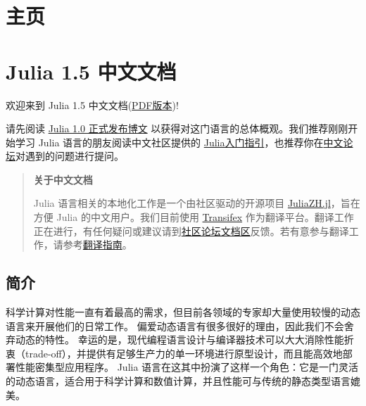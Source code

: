 
\part{主页}


\hypertarget{12259063490654611425}{}


\part{Julia 1.5 中文文档}



欢迎来到 Julia 1.5 中文文档(\href{https://raw.githubusercontent.com/JuliaCN/JuliaZH.jl/pdf/dev/Julia中文文档.pdf}{PDF版本})!



请先阅读 \href{https://julialang.org/blog/2018/08/one-point-zero-zh\_cn}{Julia 1.0 正式发布博文} 以获得对这门语言的总体概观。我们推荐刚刚开始学习 Julia 语言的朋友阅读中文社区提供的 \href{https://discourse.juliacn.com/t/topic/159}{Julia入门指引}，也推荐你在\href{https://discourse.juliacn.com}{中文论坛}对遇到的问题进行提问。



\begin{quote}
\textbf{关于中文文档}

Julia 语言相关的本地化工作是一个由社区驱动的开源项目 \href{https://github.com/JuliaCN/JuliaZH.jl}{JuliaZH.jl}，旨在方便 Julia 的中文用户。我们目前使用 \href{https://www.transifex.com}{Transifex} 作为翻译平台。翻译工作正在进行，有任何疑问或建议请到\href{https://discourse.juliacn.com/c/community/document}{社区论坛文档区}反馈。若有意参与翻译工作，请参考\href{https://discourse.juliacn.com/t/topic/277}{翻译指南}。

\end{quote}


\hypertarget{3498245216777255645}{}


\chapter{简介}



科学计算对性能一直有着最高的需求，但目前各领域的专家却大量使用较慢的动态语言来开展他们的日常工作。 偏爱动态语言有很多很好的理由，因此我们不会舍弃动态的特性。 幸运的是，现代编程语言设计与编译器技术可以大大消除性能折衷（trade-off），并提供有足够生产力的单一环境进行原型设计，而且能高效地部署性能密集型应用程序。 Julia 语言在这其中扮演了这样一个角色：它是一门灵活的动态语言，适合用于科学计算和数值计算，并且性能可与传统的静态类型语言媲美。



